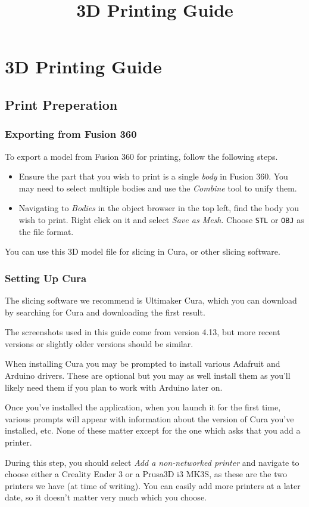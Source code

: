 \documentclass[12pt]{report}
\begin{document}
\raggedright

\title{3D Printing Guide}
\chapter*{3D Printing Guide}

\section*{Print Preperation}
\label{sec:preperation}

\subsection*{Exporting from Fusion 360}
\label{sec:exporting}

To export a model from Fusion 360 for printing, follow the following steps.

\begin{itemize}
    \item Ensure the part that you wish to print is a single \textit{body} in
        Fusion 360. You may need to select multiple bodies and use the
        \textit{Combine} tool to unify them.
    \item Navigating to \textit{Bodies} in the object browser in the top left,
        find the body you wish to print. Right click on it and select
        \textit{Save as Mesh}. Choose \texttt{STL} or \texttt{OBJ} as the file
        format. 
\end{itemize}

You can use this 3D model file for slicing in Cura, or other slicing software.

\subsection*{Setting Up Cura}
\label{sec:setup}

The slicing software we recommend is Ultimaker Cura, which you can download by
searching for Cura and downloading the first result. \par
The screenshots used in this guide come from version 4.13, but more recent
versions or slightly older versions should be similar. \par
When installing Cura you may be prompted to install various Adafruit and
Arduino drivers. These are optional but you may as well install them as you'll
likely need them if you plan to work with Arduino later on. \par
Once you've installed the application, when you launch it for the first time,
various prompts will appear with information about the version of Cura you've
installed, etc. None of these matter except for the one which asks that you
add a printer. \par
During this step, you should select \textit{Add a non-networked printer} and
navigate to choose either a Creality Ender 3 or a Prusa3D i3 MK3S, as these
are the two printers we have (at time of writing). You can easily add more
printers at a later date, so it doesn't matter very much which you choose.
\end{document}
